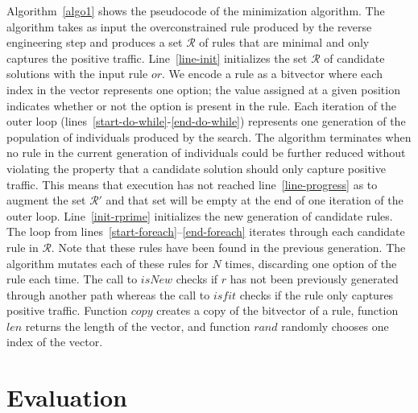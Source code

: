 \documentclass[runningheads]{llncs}
\begin{document}
Algorithm~\ref{algo1} shows the pseudocode of the \tname{}
minimization algorithm. The algorithm takes as input the
overconstrained rule produced by the reverse engineering step and
produces a set $\mathcal R$ of rules that are minimal and only
captures the positive traffic. Line~\ref{line-init} initializes the
set $\mathcal{R}$ of candidate solutions with the input rule $or$. We
encode a rule as a bitvector where each index in the vector represents
one option; the value assigned at a given position indicates whether
or not the option is present in the rule. Each iteration of the outer
loop (lines~\ref{start-do-while}-\ref{end-do-while}) represents one
generation of the population of individuals produced by the
search. The algorithm terminates when no rule in the current
generation of individuals could be further reduced without violating
the property that a candidate solution should only capture positive
traffic. This means that execution has not reached
line~\ref{line-progress} as to augment the set $\mathcal{R'}$ and that
set will be empty at the end of one iteration of the outer
loop. Line~\ref{init-rprime} initializes the new generation of
candidate rules. The loop from
lines~\ref{start-foreach}--\ref{end-foreach} iterates through each
candidate rule in $\mathcal R$. Note that these rules have been found
in the previous generation. The algorithm mutates each of these rules
for $N$ times, discarding one option of the rule each time. The call
to $\mathit{isNew}$ checks if $r$ has not been previously generated
through another path whereas the call to $\mathit{isfit}$ checks if
the rule only captures positive traffic. Function $\mathit{copy}$
creates a copy of the bitvector of a rule, function $\mathit{len}$
returns the length of the vector, and function $\mathit{rand}$
randomly chooses one index of the vector.




\section{Evaluation}

\end{document}
